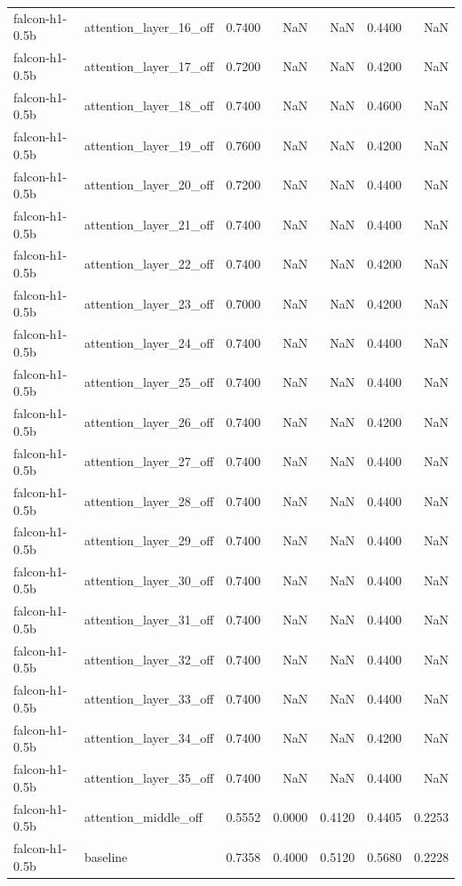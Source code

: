 \begin{tabular}{llrrrrr}
falcon-h1-0.5b & attention_layer_16_off & 0.7400 & NaN & NaN & 0.4400 & NaN \\
falcon-h1-0.5b & attention_layer_17_off & 0.7200 & NaN & NaN & 0.4200 & NaN \\
falcon-h1-0.5b & attention_layer_18_off & 0.7400 & NaN & NaN & 0.4600 & NaN \\
falcon-h1-0.5b & attention_layer_19_off & 0.7600 & NaN & NaN & 0.4200 & NaN \\
falcon-h1-0.5b & attention_layer_20_off & 0.7200 & NaN & NaN & 0.4400 & NaN \\
falcon-h1-0.5b & attention_layer_21_off & 0.7400 & NaN & NaN & 0.4400 & NaN \\
falcon-h1-0.5b & attention_layer_22_off & 0.7400 & NaN & NaN & 0.4200 & NaN \\
falcon-h1-0.5b & attention_layer_23_off & 0.7000 & NaN & NaN & 0.4200 & NaN \\
falcon-h1-0.5b & attention_layer_24_off & 0.7400 & NaN & NaN & 0.4400 & NaN \\
falcon-h1-0.5b & attention_layer_25_off & 0.7400 & NaN & NaN & 0.4400 & NaN \\
falcon-h1-0.5b & attention_layer_26_off & 0.7400 & NaN & NaN & 0.4200 & NaN \\
falcon-h1-0.5b & attention_layer_27_off & 0.7400 & NaN & NaN & 0.4400 & NaN \\
falcon-h1-0.5b & attention_layer_28_off & 0.7400 & NaN & NaN & 0.4400 & NaN \\
falcon-h1-0.5b & attention_layer_29_off & 0.7400 & NaN & NaN & 0.4400 & NaN \\
falcon-h1-0.5b & attention_layer_30_off & 0.7400 & NaN & NaN & 0.4400 & NaN \\
falcon-h1-0.5b & attention_layer_31_off & 0.7400 & NaN & NaN & 0.4400 & NaN \\
falcon-h1-0.5b & attention_layer_32_off & 0.7400 & NaN & NaN & 0.4400 & NaN \\
falcon-h1-0.5b & attention_layer_33_off & 0.7400 & NaN & NaN & 0.4400 & NaN \\
falcon-h1-0.5b & attention_layer_34_off & 0.7400 & NaN & NaN & 0.4200 & NaN \\
falcon-h1-0.5b & attention_layer_35_off & 0.7400 & NaN & NaN & 0.4400 & NaN \\
falcon-h1-0.5b & attention_middle_off & 0.5552 & 0.0000 & 0.4120 & 0.4405 & 0.2253 \\
falcon-h1-0.5b & baseline & 0.7358 & 0.4000 & 0.5120 & 0.5680 & 0.2228 \\

\end{tabular}
